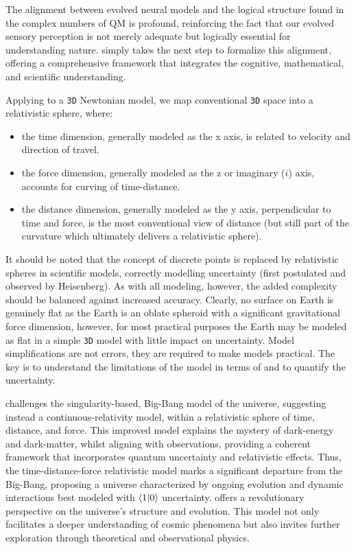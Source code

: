 \documentclass[12pt]{article}
\begin{document}
The alignment between evolved neural models and the logical structure found in the complex numbers of QM is profound, reinforcing the fact that our evolved sensory perception is not merely adequate but logically essential for understanding nature. \iR{} simply takes the next step to formalize this alignment, offering a comprehensive framework that integrates the cognitive, mathematical, and scientific understanding.

Applying \iR{} to a \texttt{3D} Newtonian model, we map conventional \texttt{3D} space into a \iR{} relativistic sphere, where:
\begin{itemize}
    \item the time dimension, generally modeled as the x axis, is related to velocity and direction of travel.
    \item the force dimension, generally modeled as the z or imaginary (\(i\)) axis, accounts for curving of time-distance.
    \item the distance dimension, generally modeled as the y axis, perpendicular to time and force, is the most conventional view of distance (but still part of the \iR{} curvature which ultimately delivers a relativistic sphere).
\end{itemize}

It should be noted that the concept of discrete points is replaced by relativistic spheres in \iR{} scientific models, correctly modelling uncertainty (first postulated and observed by Heisenberg). As with all modeling, however, the added complexity should be balanced against increased accuracy. Clearly, no surface on Earth is genuinely flat as the Earth is an oblate spheroid with a significant gravitational force dimension, however, for most practical purposes the Earth may be modeled as flat in a simple \texttt{3D} model with little impact on uncertainty. Model simplifications are not errors, they are required to make models practical. The key is to understand the limitations of the model in terms of \iR{} and to quantify the uncertainty.

\iR{} challenges the singularity-based, Big-Bang model of the universe, suggesting instead a continuous-relativity model, within a relativistic \iR{} sphere of time, distance, and force. This improved model explains the mystery of dark-energy and dark-matter, whilst aligning with observations, providing a coherent framework that incorporates quantum uncertainty and relativistic effects. Thus, the \iR{} time-distance-force relativistic model marks a significant departure from the Big-Bang, proposing a universe characterized by ongoing evolution and dynamic interactions best modeled with \(\langle 1 | 0 \rangle\) uncertainty. \iR{} offers a revolutionary perspective on the universe's structure and evolution. This model not only facilitates a deeper understanding of cosmic phenomena but also invites further exploration through theoretical and observational physics.
\end{document}
